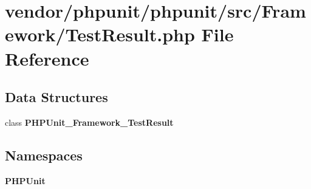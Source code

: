 \section{vendor/phpunit/phpunit/src/\+Framework/\+Test\+Result.php File Reference}
\label{_test_result_8php}
\subsection*{Data Structures}
\begin{DoxyCompactItemize}
\item 
class {\bf P\+H\+P\+Unit\+\_\+\+Framework\+\_\+\+Test\+Result}
\end{DoxyCompactItemize}
\subsection*{Namespaces}
\begin{DoxyCompactItemize}
\item 
 {\bf P\+H\+P\+Unit}
\end{DoxyCompactItemize}
